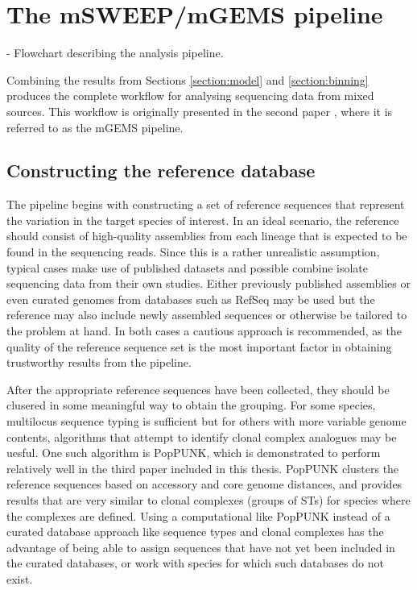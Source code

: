 \documentclass[officiallayout]{tktla}
\begin{document}
\section{The mSWEEP/mGEMS pipeline}

- Flowchart describing the analysis pipeline.

Combining the results from Sections \ref{section:model} and
\ref{section:binning} produces the complete workflow for analysing
sequencing data from mixed sources. This workflow is originally
presented in the second paper \citep{maklin_bacterial_2021}, where it
is referred to as the mGEMS pipeline.

\subsection{Constructing the reference database}

The pipeline begins with constructing a set of reference sequences
that represent the variation in the target species of interest. In an
ideal scenario, the reference should consist of high-quality
assemblies from each lineage that is expected to be found in the
sequencing reads. Since this is a rather unrealistic assumption,
typical cases make use of published datasets and possible combine
isolate sequencing data from their own studies. Either previously
published assemblies or even curated genomes from databases such as
RefSeq may be used but the reference may also include newly assembled
sequences or otherwise be tailored to the problem at hand. In both
cases a cautious approach is recommended, as the quality of the
reference sequence set is the most important factor in obtaining
trustworthy results from the pipeline.

After the appropriate reference sequences have been collected, they
should be clusered in some meaningful way to obtain the grouping. For
some species, multilocus sequence typing is sufficient but for others
with more variable genome contents, algorithms that attempt to
identify clonal complex analogues may be uesful. One such algorithm is
PopPUNK, which is demonstrated to perform relatively well in the third
paper included in this thesis. PopPUNK clusters the reference
sequences based on accessory and core genome distances, and provides
results that are very similar to clonal complexes (groups of STs) for
species where the complexes are defined. Using a computational like
PopPUNK instead of a curated database approach like sequence types and
clonal complexes has the advantage of being able to assign sequences
that have not yet been included in the curated databases, or work with
species for which such databases do not exist.
\end{document}
